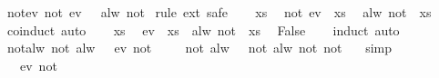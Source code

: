 \begin{isabellebody}
\isanewline
%
\endisadelimproof
\isanewline
{}\isamarkupfalse%
\ not{\isacharunderscore}ev{\isacharcolon}\ {\isachardoublequoteopen}not\ {\isacharparenleft}ev\ {\isasymphi}{\isacharparenright}\ {\isacharequal}\ alw\ {\isacharparenleft}not\ {\isasymphi}{\isacharparenright}{\isachardoublequoteclose}\isanewline
%
\isadelimproof
%
\endisadelimproof
%
\isatagproof
{}\isamarkupfalse%
{\isacharparenleft}rule\ ext{\isacharcomma}\ safe{\isacharparenright}\isanewline
\ \ \isamarkupfalse%
\ xs\ \isamarkupfalse%
\ {\isachardoublequoteopen}not\ {\isacharparenleft}ev\ {\isasymphi}{\isacharparenright}\ xs{\isachardoublequoteclose}\ \isamarkupfalse%
\ {\isachardoublequoteopen}alw\ {\isacharparenleft}not\ {\isasymphi}{\isacharparenright}\ xs{\isachardoublequoteclose}\isanewline
\ \ \isamarkupfalse%
\ {\isacharparenleft}coinduct{\isacharparenright}\ auto\isanewline
{}\isamarkupfalse%
\isanewline
\ \ \isamarkupfalse%
\ xs\ \isamarkupfalse%
\ {\isachardoublequoteopen}ev\ {\isasymphi}\ xs{\isachardoublequoteclose}\ \ {\isachardoublequoteopen}alw\ {\isacharparenleft}not\ {\isasymphi}{\isacharparenright}\ xs{\isachardoublequoteclose}\ \isamarkupfalse%
\ False\isanewline
\ \ \isamarkupfalse%
\ {\isacharparenleft}induct{\isacharparenright}\ auto\isanewline
{}\isamarkupfalse%
%
\endisatagproof
{\isafoldproof}%
%
\isadelimproof
\isanewline
%
\endisadelimproof
\isanewline
{}\isamarkupfalse%
\ not{\isacharunderscore}alw{\isacharcolon}\ {\isachardoublequoteopen}not\ {\isacharparenleft}alw\ {\isasymphi}{\isacharparenright}\ {\isacharequal}\ ev\ {\isacharparenleft}not\ {\isasymphi}{\isacharparenright}{\isachardoublequoteclose}\isanewline
%
\isadelimproof
%
\endisadelimproof
%
\isatagproof
{}\isamarkupfalse%
{\isacharminus}\isanewline
\ \ \isamarkupfalse%
\ {\isachardoublequoteopen}not\ {\isacharparenleft}alw\ {\isasymphi}{\isacharparenright}\ {\isacharequal}\ not\ {\isacharparenleft}alw\ {\isacharparenleft}not\ {\isacharparenleft}not\ {\isasymphi}{\isacharparenright}{\isacharparenright}{\isacharparenright}{\isachardoublequoteclose}\ \isamarkupfalse%
\ simp\isanewline
\ \ \isamarkupfalse%
\ \isamarkupfalse%
\ {\isachardoublequoteopen}{\isachardot}{\isachardot}{\isachardot}\ {\isacharequal}\ ev\ {\isacharparenleft}not\ {\isasymphi}{\isacharparenright}{\isachardoublequoteclose}\ \isamarkupfalse%

\end{isabellebody}
